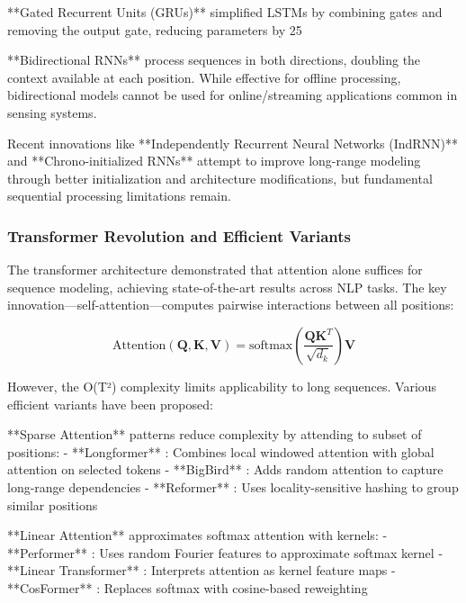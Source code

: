 \documentclass[10pt,journal,compsoc]{IEEEtran}
\begin{document}
**Gated Recurrent Units (GRUs)** \cite{cho2014gru} simplified LSTMs by combining gates and removing the output gate, reducing parameters by 25%

**Bidirectional RNNs** process sequences in both directions, doubling the context available at each position. While effective for offline processing, bidirectional models cannot be used for online/streaming applications common in sensing systems.

Recent innovations like **Independently Recurrent Neural Networks (IndRNN)** and **Chrono-initialized RNNs** attempt to improve long-range modeling through better initialization and architecture modifications, but fundamental sequential processing limitations remain.

\subsubsection{Transformer Revolution and Efficient Variants}

The transformer architecture \cite{vaswani2017attention} demonstrated that attention alone suffices for sequence modeling, achieving state-of-the-art results across NLP tasks. The key innovation—self-attention—computes pairwise interactions between all positions:

\begin{equation}
\text{Attention}(\mathbf{Q}, \mathbf{K}, \mathbf{V}) = \text{softmax}\left(\frac{\mathbf{Q}\mathbf{K}^T}{\sqrt{d_k}}\right)\mathbf{V}
\end{equation}

However, the O(T²) complexity limits applicability to long sequences. Various efficient variants have been proposed:

**Sparse Attention** patterns reduce complexity by attending to subset of positions:
- **Longformer** \cite{beltagy2020longformer}: Combines local windowed attention with global attention on selected tokens
- **BigBird** \cite{zaheer2020bigbird}: Adds random attention to capture long-range dependencies
- **Reformer** \cite{kitaev2020reformer}: Uses locality-sensitive hashing to group similar positions

**Linear Attention** approximates softmax attention with kernels:
- **Performer** \cite{choromanski2021performer}: Uses random Fourier features to approximate softmax kernel
- **Linear Transformer** \cite{katharopoulos2020transformers}: Interprets attention as kernel feature maps
- **CosFormer** \cite{qin2022cosformer}: Replaces softmax with cosine-based reweighting
\end{document}
